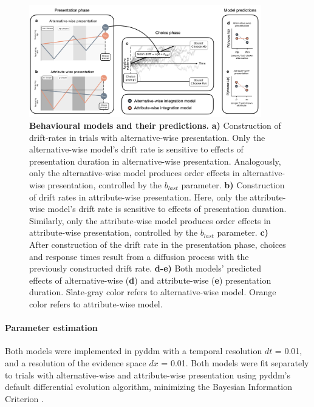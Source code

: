 \documentclass[11pt, a4paper, twocolumn, abstract]{scrartcl}
\begin{document}
\begin{figure}[t]
    \centering
    \includegraphics[width=0.9\textwidth]{figures/behavioural_models.png}
    \caption{\textbf{Behavioural models and their predictions.} \textbf{a)} Construction of drift-rates in trials with alternative-wise presentation. Only the alternative-wise model’s drift rate is sensitive to effects of presentation duration in alternative-wise presentation. Analogously, only the alternative-wise model produces order effects in alternative-wise presentation, controlled by the $b_{last}$  parameter. \textbf{b)} Construction of drift rates in attribute-wise presentation. Here, only the attribute-wise model’s drift rate is sensitive to effects of presentation duration. Similarly, only the attribute-wise model produces order effects in attribute-wise presentation, controlled by the $b_{last}$ parameter. \textbf{c)} After construction of the drift rate in the presentation phase, choices and response times result from a diffusion process with the previously constructed drift rate. \textbf{d-e)} Both models’ predicted effects of alternative-wise (\textbf{d}) and attribute-wise (\textbf{e}) presentation duration. Slate-gray color refers to alternative-wise model. Orange color refers to attribute-wise model.}
    \label{fig:models}
\end{figure}

\paragraph{Parameter estimation}
Both models were implemented in pyddm \parencite{shinn2020FlexibleFrameworkSimulating} with a temporal resolution $dt$ = 0.01, and a resolution of the evidence space $dx$ = 0.01. 
Both models were fit separately to trials with alternative-wise and attribute-wise presentation using pyddm’s default differential evolution algorithm, minimizing the Bayesian Information Criterion \parencite[BIC;][]{schwarz1978EstimatingDimensionModel}.
\end{document}
